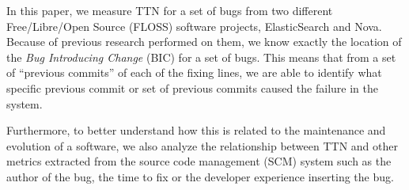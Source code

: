 \documentclass[10pt, conference]{IEEEtran}
\begin{document}

In this paper, we measure TTN for a set of bugs from two different Free/Libre/Open Source (FLOSS) software projects, ElasticSearch and Nova. Because of previous research performed on them, we know exactly the location of the \emph{Bug Introducing Change} (BIC) for a set of bugs. This means that from a set of ``previous commits'' of each of the fixing lines, we are able to identify what specific previous commit or set of previous commits caused the failure in the system.

Furthermore, to better understand how this is related to the maintenance and evolution of a software, we also analyze the relationship between TTN and other metrics extracted from the source code management (SCM) system such as the author of the bug, the time to fix or the developer experience inserting the bug.

\end{document}
